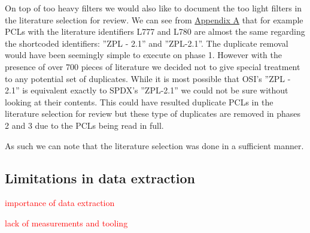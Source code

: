 On top of too heavy filters we would also like to document the too light filters in the literature selection for review. We can see from \hyperref[appendix:a]{Appendix A} that for example PCLs with the literature identifiers L777 and L780 are almost the same regarding the shortcoded identifiers: ''ZPL - 2.1'' and ''ZPL-2.1''. The duplicate removal would have been seemingly simple to execute on phase 1. However with the presence of over 700 pieces of literature we decided not to give special treatment to any potential set of duplicates. While it is most possible that OSI's ''ZPL - 2.1'' is equivalent exactly to SPDX's ''ZPL-2.1'' we could not be sure without looking at their contents. This could have resulted duplicate PCLs in the literature selection for review but these type of duplicates are removed in phases 2 and 3 due to the PCLs being read in full.

As such we can note that the literature selection was done in a sufficient manner.

\subsection{Limitations in data extraction}

\textcolor{red}{importance of data extraction}

\textcolor{red}{lack of measurements and tooling}